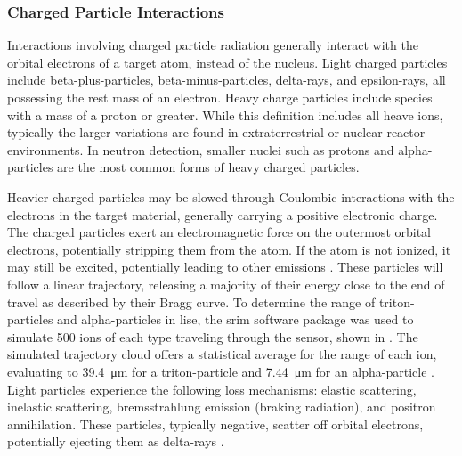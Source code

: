 \documentclass[../../../../main.tex]{subfiles}%
\begin{document}
%
    \subsubsection{Charged Particle Interactions}%
    \label{sec:chapter-2:semiconductor-detectors:pulse-formation:charged-particles}%
    Interactions involving charged particle radiation generally interact with the orbital electrons of a target atom, instead of the nucleus.
    Light charged particles include \glspl{beta-plus-particle}, \glspl{beta-minus-particle}, \glspl{delta-ray}, and \glspl{epsilon-ray}, all possessing the rest mass of an electron.
    Heavy charge particles include species with a mass of a proton or greater.
    While this definition includes all heave ions, typically the larger variations are found in extraterrestrial or nuclear reactor environments.
    In neutron detection, smaller nuclei such as protons and \glspl{alpha-particle} are the most common forms of heavy charged particles.
    \par%
    Heavier charged particles may be slowed through Coulombic interactions with the electrons in the target material, generally carrying a positive electronic charge.
    The charged particles exert an electromagnetic force on the outermost orbital electrons, potentially stripping them from the atom.
    If the atom is not ionized, it may still be excited, potentially leading to other emissions \cite{book:Das_2003}.
    These particles will follow a linear trajectory, releasing a majority of their energy close to the end of travel as described by their Bragg curve.
    To determine the range of \glspl{triton-particle} and \glspl{alpha-particle} in \gls{lise}, the \gls{srim} software package was used to simulate 500 ions of each type traveling through the sensor, shown in  \cite{Ziegler_2010}.
    The simulated trajectory cloud offers a statistical average for the range of each ion, evaluating to \SI{39.4}{\micro\meter} for a \gls{triton-particle} and \SI{7.44}{\micro\meter} for an \gls{alpha-particle} \cite{Lukosi_2016}.
    Light particles experience the following loss mechanisms: elastic scattering, inelastic scattering, bremsstrahlung emission (braking radiation), and positron annihilation. 
    These particles, typically negative, scatter off orbital electrons, potentially ejecting them as \glspl{delta-ray} \cite{book:Turner_1995}.
\end{document}
